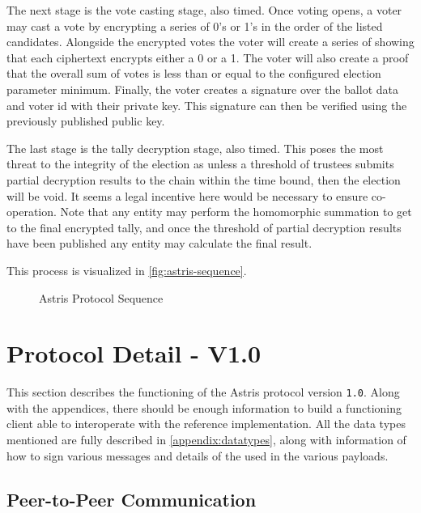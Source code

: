 The next stage is the vote casting stage, also timed. Once voting opens, a voter may cast a vote by encrypting a series of 0's or 1's in the order of the listed candidates. Alongside the encrypted votes the voter will create a series of  showing that each ciphertext encrypts either a 0 or a 1. The voter will also create a proof that the overall sum of votes is less than or equal to the configured election parameter minimum. Finally, the voter creates a signature over the ballot data and voter id with their private key. This signature can then be verified using the previously published public key.

The last stage is the tally decryption stage, also timed. This poses the most threat to the integrity of the election as unless a threshold of trustees submits partial decryption results to the chain within the time bound, then the election will be void. It seems a legal incentive here would be necessary to ensure co-operation. Note that any entity may perform the homomorphic summation to get to the final encrypted tally, and once the threshold of partial decryption results have been published any entity may calculate the final result.

This process is visualized in \autoref{fig:astris-sequence}.

\begin{figure}[H]
    \centering
    
    \caption{Astris Protocol Sequence}
    \label{fig:astris-sequence}
\end{figure}

\section{Protocol Detail - V1.0}
\label{ch:astris:detail}

This section describes the functioning of the Astris protocol version \texttt{1.0}. Along with the appendices, there should be enough information to build a functioning client able to interoperate with the reference implementation. All the data types mentioned are fully described in \autoref{appendix:datatypes}, along with information of how to sign various messages and details of the  used in the various payloads.

\subsection{Peer-to-Peer Communication}
\label{ch:astris:detail:p2p}

